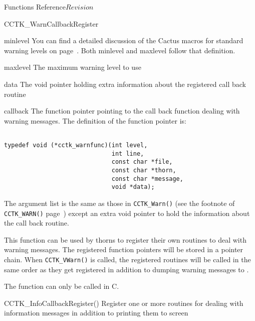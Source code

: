 \begin{cactuspart}{ Functions Reference}{}{$Revision$}
\begin{FunctionDescription}{CCTK\_WarnCallbackRegister}
\begin{ParameterSection}
\begin{Parameter}{minlevel}
You can find a detailed discussion of the Cactus macros for standard
warning levels on page~\pageref{CCTK-VInfo}. Both minlevel and maxlevel follow
that definition.

\end{Parameter}

\begin{Parameter}{maxlevel}
The maximum warning level to use

\end{Parameter}

\begin{Parameter}{data}
The void pointer holding extra information about the registered call back
routine
\end{Parameter}

\begin{Parameter}{callback}
The function pointer pointing to the call back function dealing with
warning messages. The definition of the function pointer is:
\begin{verbatim}

typedef void (*cctk_warnfunc)(int level,
                              int line,
                              const char *file,
                              const char *thorn,
                              const char *message,
                              void *data);

\end{verbatim}

The argument list is the same as those in \verb|CCTK_Warn()|
(see the footnote of \verb|CCTK_WARN()| page~\pageref{CCTK-WARN})
except an extra void pointer to hold the information about the call
back routine.

\end{Parameter}

\end{ParameterSection}

\begin{Discussion}
This function can be used by thorns to register their own routines to
deal with warning messages. The registered function pointers will be
stored in a pointer chain. When \verb|CCTK_VWarn()| is called, the
registered routines will be called in the same order as they get
registered in addition to dumping warning messages to .

The function can only be called in C.
\end{Discussion}

\begin{SeeAlsoSection}
\begin{SeeAlso}{CCTK\_InfoCallbackRegister()}
Register one or more routines for dealing with information messages in
addition to printing them to screen
\end{SeeAlso}


\end{SeeAlsoSection}
\end{FunctionDescription}
\end{cactuspart}

